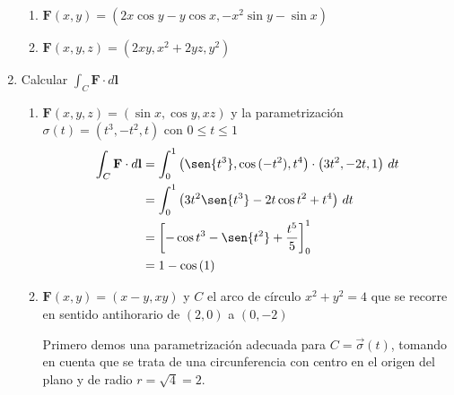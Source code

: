 \documentclass{article}
\begin{document}
\begin{enumerate}
{            \begin{enumerate}
            \item{
				$\mathbf{F} (x,y) = (2x\cos y - y\cos x, -x^2\sin y -\sin x)$

			\color{azul}


            }

            \item{
            	$\mathbf{F} (x,y,z) = (2xy, x^2 + 2yz, y^2)$

           \color{azul}

            }
            \end{enumerate}
        }

        \item {
           Calcular $\displaystyle\int_{C} \mathbf{F} \cdot d \mathbf{l}$

            \begin{enumerate}
            \item{
                $\mathbf{F} (x,y,z) = (\sin x,\cos y,xz)$ y la parametrización
                $\sigma (t) = (t^3,-t^2,t)$ con $0\leq t\leq 1$
                \color{azul}
                \begin{align*}
                    \int_{C}{\mathbf{F} \cdot d \mathbf{l}}
                    &= \int_{0}^{1}{
                        \left(\sen{t^3}, \cos{(-t^2)}, t^4\right)
                        \cdot\left(3t^2, -2t, 1 \right)
                    \,dt}\\
                    &= \int_{0}^{1}{\left(
                        3t^2\sen{t^3}-2t\cos{t^2}+t^4
                    \right)\,dt}\\
                    &= \left[
                        -\cos{t^3}-\sen{t^2}+\frac{t^5}{5}
                        \right]_{0}^{1}\\
                    &= 1-\cos{(1)}
                \end{align*}
            }
            \item{
                $\mathbf{F} (x,y) = (x-y,xy)$ y $C$ el arco de círculo
                $x^2 + y^2 = 4$ que se recorre en sentido antihorario de $(2,0)$
                a $(0,-2)$

                \color{azul}
                Primero demos una parametrización adecuada para $C=\vec{\sigma}
                (t)$, tomando en cuenta que se trata de una circunferencia con
                centro en el origen del plano y de radio $r=\sqrt{4}=2$.

}
\end{enumerate}}
\end{enumerate}
\end{document}
